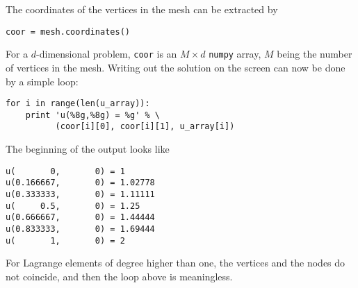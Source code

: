 The coordinates of the vertices in the mesh can be extracted
by
\begin{Verbatim}[fontsize=\fontsize{10pt}{10pt},tabsize=8,baselinestretch=1.05,
fontfamily=tt,xleftmargin=7mm]
coor = mesh.coordinates()
\end{Verbatim}
\noindent
For a $d$-dimensional problem, {\fontsize{12pt}{12pt}\verb!coor!} is an $M\times d$ 
{\fontsize{12pt}{12pt}\texttt{numpy}} array,
$M$ being the number of vertices in the mesh. Writing out the solution
on the screen can now be done by a simple loop:
\begin{Verbatim}[fontsize=\fontsize{10pt}{10pt},tabsize=8,baselinestretch=1.05,
fontfamily=tt,xleftmargin=7mm]
for i in range(len(u_array)):
    print 'u(%8g,%8g) = %g' % \  
          (coor[i][0], coor[i][1], u_array[i])
\end{Verbatim}
\noindent
The beginning of the output looks like
\begin{Verbatim}[fontsize=\fontsize{10pt}{10pt},tabsize=8,baselinestretch=1.05,
fontfamily=tt,xleftmargin=7mm]
u(       0,       0) = 1
u(0.166667,       0) = 1.02778
u(0.333333,       0) = 1.11111
u(     0.5,       0) = 1.25
u(0.666667,       0) = 1.44444
u(0.833333,       0) = 1.69444
u(       1,       0) = 2
\end{Verbatim}
\noindent
For Lagrange elements of
degree higher than one, 
the vertices and the nodes do not coincide, and then
the loop above is meaningless.


